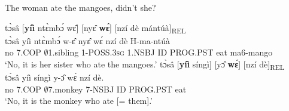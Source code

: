 \begin{exe} 
\ex\label{cleft4}  The woman ate the mangoes, didn't she?
\begin{xlist}
\ex \label{cleft4b}
  \glll tɔ̀sâ [{\bfseries yíì} ntɛ̀mbɔ́ wɛ̂] [nyɛ̂ {\bfseries wɛ́}] [nzí dè mántúà]\textsubscript{REL}\\
         tɔ̀sâ yíì ntɛ̀mbɔ́ w-ɛ̂ nyɛ̂ wɛ́ nzí dè H-ma-ntúà\\
       no 7.COP $\emptyset$1.sibling 1-POSS.3\textsc{sg} 1.NSBJ ID PROG.PST eat ma6-mango \\
    \trans `No, it is her sister who ate the mangoes.'
\ex \label{cleft4c}
  \glll tɔ̀sâ [{\bfseries yíì} síngì] [yɔ̂ {\bfseries wɛ́}] [nzí dè]\textsubscript{REL}\\
        tɔ̀sâ yíì síngì y-ɔ̂ wɛ́ nzí dè.\\
       no 7.COP $\emptyset$7.monkey 7-NSBJ ID PROG.PST eat  \\
    \trans `No, it is the monkey who ate [= them].'
\end {xlist}
\end{exe}














